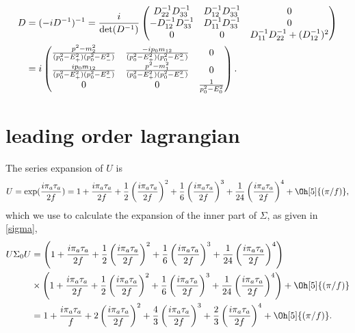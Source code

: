 \documentclass{article}
\begin{document}
\begin{align}
    \notag
    D & = (- iD^{-1})^{-1} = \frac{i}{\det(D^{-1})}
    \begin{pmatrix}
        D^{-1}_{22} D^{-1}_{33}   & D^{-1}_{12}D^{-1}_{33}  & 0 \\
        -D^{-1}_{12}D^{-1}_{33}   & D^{-1}_{11}D^{-1}_{33}  & 0 \\
        0               & 0             & D^{-1}_{11}D^{-1}_{22} + (D^{-1}_{12})^2
    \end{pmatrix} \\
    \label{free pion propagator}
    & = i
    \begin{pmatrix}
        \frac{
            p^2 - m_2^2
        }
        {
            (p_0^2 - E_+^2)(p_0^2 - E_-^2)
        } 
        & \frac{
            - ip_0m_{12}
        }
        {
            (p_0^2 - E_+^2)(p_0^2 - E_-^2)
        } & 0 \\
        \frac{
            ip_0m_{12}
        }
        {
            (p_0^2 - E_+^2)(p_0^2 - E_-^2)
        }
        & \frac{
            p^2 - m_1^2
        }
        {
            (p_0^2 - E_+^2)(p_0^2 - E_-^2)
        } & 0 \\
        0 & 0 & 
        \frac{1}{p_0^2 - E_0^2}
    \end{pmatrix}.
\end{align}


\section{leading order lagrangian}
The series expansion of $U$ is
\begin{align*}
    U = \exp(\frac{i \pi_a \tau_a}{2f}) = 
    1
    + \frac{i \pi_a \tau_a}{2f} 
    + \frac{1}{2}\left(\frac{i \pi_a \tau_a}{2f}\right)^2 
    + \frac{1}{6}\left(\frac{i \pi_a \tau_a}{2f}\right)^3 
    + \frac{1}{24}\left(\frac{i \pi_a \tau_a}{2f}\right)^4 
    + \Oh[5]{(\pi/f)},
\end{align*}
which we use to calculate the expansion of the inner part of $\Sigma$, as given in \cref{sigma},
\begin{align*}
    U\Sigma_0U & = 
    \left(
        1
        + \frac{i \pi_a \tau_a}{2f} 
        + \frac{1}{2}\left(\frac{i \pi_a \tau_a}{2f}\right)^2 
        + \frac{1}{6}\left(\frac{i \pi_a \tau_a}{2f}\right)^3 
        + \frac{1}{24}\left(\frac{i \pi_a \tau_a}{2f}\right)^4 
    \right)\\
    & \times
    \left(
        1
        + \frac{i \pi_a \tau_a}{2f} 
        + \frac{1}{2}\left(\frac{i \pi_a \tau_a}{2f}\right)^2 
        + \frac{1}{6}\left(\frac{i \pi_a \tau_a}{2f}\right)^3 
        + \frac{1}{24}\left(\frac{i \pi_a \tau_a}{2f}\right)^4 
    \right)
    + \Oh[5]{(\pi/f)}\\
    &=
    1 + \frac{i \pi_a \tau_a}{f}
    + 2 \left( \frac{i \pi_a \tau_a}{2f} \right)^2
    + \frac{4}{3} \left( \frac{i \pi_a \tau_a}{2f} \right)^3
    + \frac{2}{3} \left( \frac{i \pi_a \tau_a}{2f} \right)^4
    + \Oh[5]{(\pi/f)}.
\end{align*}
\end{document}
